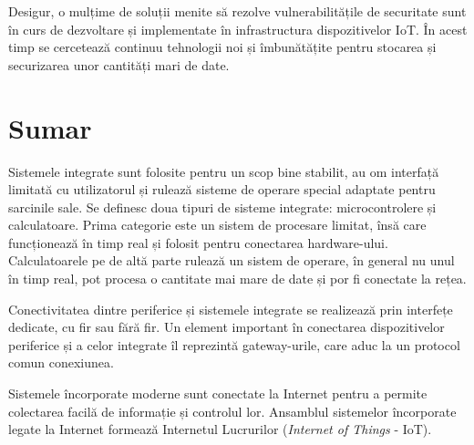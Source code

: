 Desigur, o mulțime de soluții menite să rezolve vulnerabilitățile de securitate
sunt în curs de dezvoltare și implementate în infrastructura dispozitivelor IoT.
În acest timp se cercetează continuu tehnologii noi și îmbunătățite pentru stocarea
și securizarea unor cantități mari de date.

\section{Sumar}
\label{sec:embed:summary}

Sistemele integrate sunt folosite pentru un scop bine stabilit, au om interfață
limitată cu utilizatorul și rulează sisteme de operare special adaptate pentru
sarcinile sale. Se definesc doua tipuri de sisteme integrate: microcontrolere și
calculatoare. Prima categorie este un sistem de procesare limitat, însă care
funcționează în timp real și folosit pentru conectarea hardware-ului.
Calculatoarele pe de altă parte rulează un sistem de operare, în general nu unul
în timp real, pot procesa o cantitate mai mare de date și por fi conectate la
rețea.

Conectivitatea dintre periferice și sistemele integrate se realizează prin interfețe dedicate, cu fir sau fără fir.
Un element important în conectarea dispozitivelor periferice și a celor integrate îl reprezintă gateway-urile, care aduc la un protocol comun conexiunea.

Sistemele încorporate moderne sunt conectate la Internet pentru a permite colectarea facilă de informație și controlul lor.
Ansamblul sistemelor încorporate legate la Internet formează Internetul Lucrurilor (\textit{Internet of Things} - IoT).

